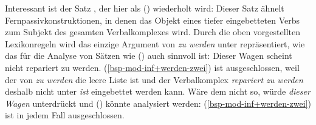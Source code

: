 {Interessant ist der Satz , der hier als () wiederholt wird:
\z
Dieser Satz ähnelt Fernpassivkonstruktionen, in denen das Objekt eines tiefer eingebetteten
Verbs zum Subjekt des gesamten Verbalkomplexes wird. Durch die oben vorgestellten Lexikonregeln
wird das einzige Argument von \emph{zu werden} unter \subj repräsentiert, wie das für
die Analyse von Sätzen wie () auch sinnvoll ist:
\ea
Dieser Wagen scheint nicht repariert zu werden.
\z
(\ref{bsp-mod-inf+werden-zwei}) ist ausgeschlossen, weil der \daw von \emph{zu werden} die
leere Liste ist und der Verbalkomplex \emph{repariert zu werden} deshalb nicht unter \emph{ist}
eingebettet werden kann. Wäre dem nicht so, würde \emph{dieser Wagen} unterdrückt und ()
könnte analysiert werden:
\z
(\ref{bsp-mod-inf+werden-zwei}) ist in jedem Fall ausgeschlossen.


}
